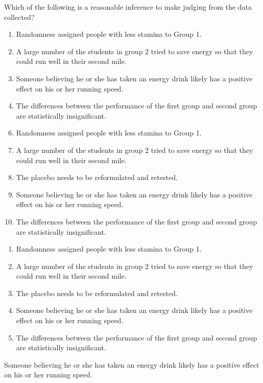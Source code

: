  
Which of the following is a reasonable inference to make judging from the data collected?


\ifsat
	\begin{enumerate}[label=\Alph*)]
		\item Randomness assigned people with less stamina to Group 1.
		\item A large number of the students in group 2 tried to save energy so that they could run well in their second mile.
		\item Someone believing he or she has taken an energy drink likely has a positive effect on his or her running speed. %
		\item The differences between the performance of the first group and second group are statistically insignificant.
	\end{enumerate}
\else
\fi

\ifacteven
	\begin{enumerate}[label=\textbf{\Alph*.},itemsep=\fill,align=left]
		\setcounter{enumii}{5}
		\item Randomness assigned people with less stamina to Group 1.
		\item A large number of the students in group 2 tried to save energy so that they could run well in their second mile.
		\item The placebo needs to be reformulated and retested.
		\addtocounter{enumii}{1}
		\item Someone believing he or she has taken an energy drink likely has a positive effect on his or her running speed. %
		\item The differences between the performance of the first group and second group are statistically insignificant.
	\end{enumerate}
\else
\fi

\ifactodd
	\begin{enumerate}[label=\textbf{\Alph*.},itemsep=\fill,align=left]
		\item Randomness assigned people with less stamina to Group 1.
		\item A large number of the students in group 2 tried to save energy so that they could run well in their second mile.
		\item The placebo needs to be reformulated and retested.
		\item Someone believing he or she has taken an energy drink likely has a positive effect on his or her running speed. %
		\item The differences between the performance of the first group and second group are statistically insignificant.
	\end{enumerate}
\else
\fi

\ifgridin
 Someone believing he or she has taken an energy drink likely has a positive effect on his or her running speed. %
		
\else
\fi

